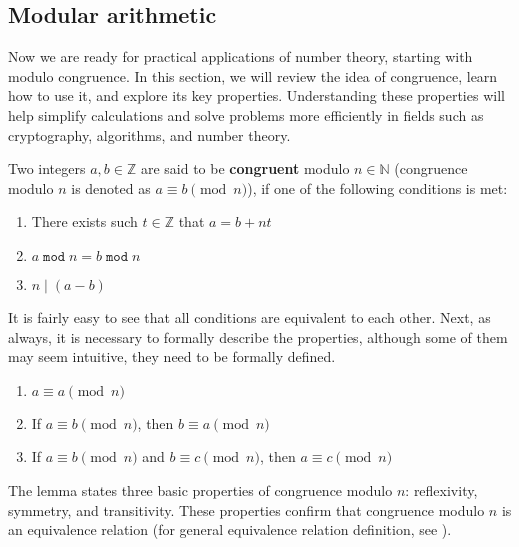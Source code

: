 \documentclass[../lecture-notes-148x210.tex]{subfiles}
\begin{document}
\subsection{Modular arithmetic}

Now we are ready for practical applications of number theory, starting with modulo congruence.
In this section, we will review the idea of congruence, learn how to use it, and explore
its key properties. Understanding these properties will help simplify calculations and solve 
problems more efficiently in fields such as cryptography, algorithms, and number theory.

\begin{definition}
    Two integers $a, b \in \mathbb{Z}$ are said to be \textbf{congruent} modulo $n \in \mathbb{N}$ (congruence modulo $n$ is denoted as $a \equiv b \pmod{n}$), if one of the following conditions is met:
    \begin{enumerate}
        \item There exists such $t \in \mathbb{Z}$ that $a = b + nt$
        \item $a \; \texttt{mod} \; n = b \; \texttt{mod} \; n$
        \item $n \mid (a - b)$
    \end{enumerate}
\end{definition}

It is fairly easy to see that all conditions are equivalent to each other. Next, as always, it is necessary to formally describe the properties, although some of them may seem intuitive, they need to be formally defined.

\begin{lemma} 
    \hfill
    \begin{enumerate}
        \item $a \equiv a \pmod{n}$
        \item If $a \equiv b \pmod{n}$, then $b \equiv a \pmod{n}$
        \item If $a \equiv b \pmod{n}$ and $b \equiv c \pmod{n}$, then $a \equiv c \pmod{n}$
    \end{enumerate}
\end{lemma}

The lemma states three basic properties of congruence modulo $n$: reflexivity, symmetry, and transitivity. 
These properties confirm that congruence modulo $n$ is an equivalence relation (for general equivalence relation definition, see ).
\end{document}
